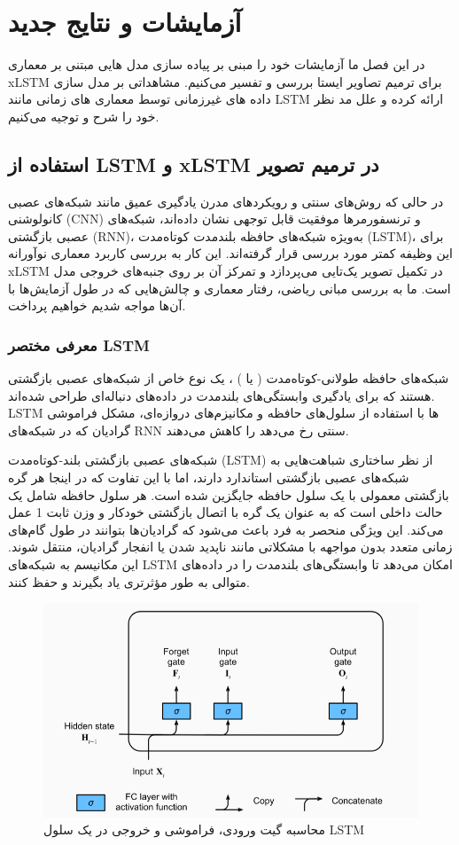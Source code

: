 
\chapter{آزمایشات و نتایج جدید}

در این فصل ما آزمایشات خود را مبنی بر پیاده سازی مدل هایی مبتنی بر معماری xLSTM برای ترمیم تصاویر ایستا بررسی و تفسیر می‌کنیم. مشاهداتی بر مدل سازی داده های غیرزمانی توسط معماری های زمانی مانند LSTM ارائه کرده و علل مد نظر خود را شرح و توجیه می‌کنیم.

\section{استفاده از LSTM و xLSTM در ترمیم تصویر}

در حالی که روش‌های سنتی و رویکردهای مدرن یادگیری عمیق مانند شبکه‌های عصبی کانولوشنی (CNN) و ترنسفورمرها موفقیت قابل توجهی نشان داده‌اند، شبکه‌های عصبی بازگشتی (RNN)، به‌ویژه شبکه‌های حافظه بلندمدت کوتاه‌مدت (LSTM)، برای این وظیفه کمتر مورد بررسی قرار گرفته‌اند. این کار به بررسی کاربرد معماری نوآورانه xLSTM در تکمیل تصویر یک‌تایی می‌پردازد و تمرکز آن بر روی جنبه‌های خروجی مدل است. ما به بررسی مبانی ریاضی، رفتار معماری و چالش‌هایی که در طول آزمایش‌ها با آن‌ها مواجه شدیم خواهیم پرداخت.

\subsection{معرفی مختصر LSTM}
شبکه‌های حافظه طولانی-کوتاه‌مدت ( یا )
\cite{hochreiterLongShortTermMemory1997}
، یک نوع خاص از شبکه‌های عصبی بازگشتی هستند که برای یادگیری وابستگی‌های بلندمدت در داده‌های دنباله‌ای طراحی شده‌اند. LSTM ها با استفاده از سلول‌های حافظه و مکانیزم‌های دروازه‌ای، مشکل فراموشی گرادیان که در شبکه‌های RNN سنتی رخ می‌دهد را کاهش می‌دهند. 

شبکه‌های عصبی بازگشتی بلند-کوتاه‌مدت (LSTM) از نظر ساختاری شباهت‌هایی به شبکه‌های عصبی بازگشتی استاندارد دارند، اما با این تفاوت که در اینجا هر گره بازگشتی معمولی با یک سلول حافظه جایگزین شده است. هر سلول حافظه شامل یک حالت داخلی است که به عنوان یک گره با اتصال بازگشتی خودکار و وزن ثابت 1 عمل می‌کند. این ویژگی منحصر به فرد باعث می‌شود که گرادیان‌ها بتوانند در طول گام‌های زمانی متعدد بدون مواجهه با مشکلاتی مانند ناپدید شدن
یا انفجار
 گرادیان، منتقل شوند. این مکانیسم به شبکه‌های LSTM امکان می‌دهد تا وابستگی‌های بلندمدت را در داده‌های متوالی به طور مؤثرتری یاد بگیرند و حفظ کنند.

\begin{figure}
	\centering
	\includegraphics[width=0.7\linewidth]{lstm1}
	\caption{محاسبه گیت ورودی،‌ فراموشی و خروجی در یک سلول LSTM}
	\label{fig:lstm1}
\end{figure}

